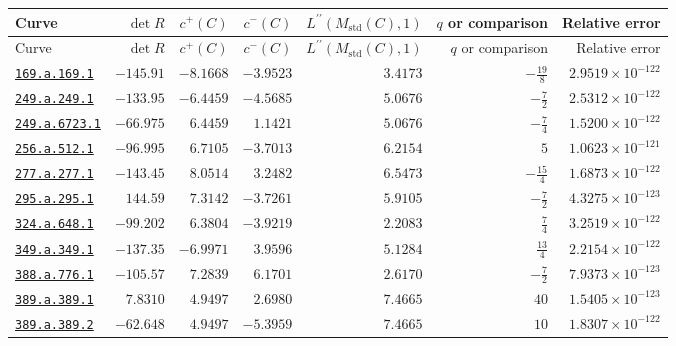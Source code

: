 \documentclass[10pt]{article}
\begin{document}
\begin{landscape}
\begin{longtable}{@{}lrrrrrr@{}}
\toprule Curve & $\det R$ & $c^+(C)$ & $c^-(C)$ & $L^{\prime\prime}(M_{\mathrm{std}}(C),1)$ & $q$ or comparison & Relative error \\ \midrule\endfirsthead
\toprule Curve & $\det R$ & $c^+(C)$ & $c^-(C)$ & $L^{\prime\prime}(M_{\mathrm{std}}(C),1)$ & $q$ or comparison & Relative error \\ \midrule\endhead
\bottomrule\endfoot
\href{https://www.lmfdb.org/Genus2Curve/Q/169/a/169/1}{\texttt{169.a.169.1}} & $-145.91$ & $-8.1668$ & $-3.9523$ & $3.4173$ & $-\frac{19}{8}$ & $2.9519\times 10^{-122}$ \\
\href{https://www.lmfdb.org/Genus2Curve/Q/249/a/249/1}{\texttt{249.a.249.1}} & $-133.95$ & $-6.4459$ & $-4.5685$ & $5.0676$ & $-\frac{7}{2}$ & $2.5312\times 10^{-122}$ \\
\href{https://www.lmfdb.org/Genus2Curve/Q/249/a/6723/1}{\texttt{249.a.6723.1}} & $-66.975$ & $6.4459$ & $1.1421$ & $5.0676$ & $-\frac{7}{4}$ & $1.5200\times 10^{-122}$ \\
\href{https://www.lmfdb.org/Genus2Curve/Q/256/a/512/1}{\texttt{256.a.512.1}} & $-96.995$ & $6.7105$ & $-3.7013$ & $6.2154$ & $5$ & $1.0623\times 10^{-121}$ \\
\href{https://www.lmfdb.org/Genus2Curve/Q/277/a/277/1}{\texttt{277.a.277.1}} & $-143.45$ & $8.0514$ & $3.2482$ & $6.5473$ & $-\frac{15}{4}$ & $1.6873\times 10^{-122}$ \\
\href{https://www.lmfdb.org/Genus2Curve/Q/295/a/295/1}{\texttt{295.a.295.1}} & $144.59$ & $7.3142$ & $-3.7261$ & $5.9105$ & $-\frac{7}{2}$ & $4.3275\times 10^{-123}$ \\
\href{https://www.lmfdb.org/Genus2Curve/Q/324/a/648/1}{\texttt{324.a.648.1}} & $-99.202$ & $6.3804$ & $-3.9219$ & $2.2083$ & $\frac{7}{4}$ & $3.2519\times 10^{-122}$ \\
\href{https://www.lmfdb.org/Genus2Curve/Q/349/a/349/1}{\texttt{349.a.349.1}} & $-137.35$ & $-6.9971$ & $3.9596$ & $5.1284$ & $\frac{13}{4}$ & $2.2154\times 10^{-122}$ \\
\href{https://www.lmfdb.org/Genus2Curve/Q/388/a/776/1}{\texttt{388.a.776.1}} & $-105.57$ & $7.2839$ & $6.1701$ & $2.6170$ & $-\frac{7}{2}$ & $7.9373\times 10^{-123}$ \\
\href{https://www.lmfdb.org/Genus2Curve/Q/389/a/389/1}{\texttt{389.a.389.1}} & $7.8310$ & $4.9497$ & $2.6980$ & $7.4665$ & $40$ & $1.5405\times 10^{-123}$ \\
\href{https://www.lmfdb.org/Genus2Curve/Q/389/a/389/2}{\texttt{389.a.389.2}} & $-62.648$ & $4.9497$ & $-5.3959$ & $7.4665$ & $10$ & $1.8307\times 10^{-122}$ \\

\end{longtable}
\end{landscape}
\end{document}
